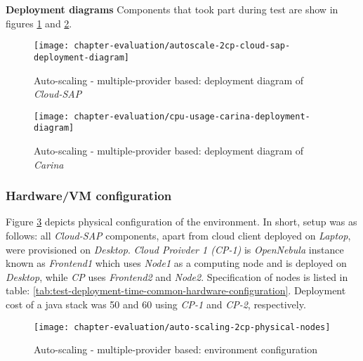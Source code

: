 \begin{asparaenum}
  
  
  \item[\textbf{Deployment diagrams}] Components that took part during test are show in figures \ref{fig:autoscale-2cp-cloud-sap-deployment-diagram} and \ref{fig:auto-scaling-2cp-carina-deployment-diagram}.

  \begin{figure}[!ht]
    \begin{center}
      \texttt{[image: chapter-evaluation/autoscale-2cp-cloud-sap-deployment-diagram]}
    \end{center}
    \caption{Auto-scaling - multiple-provider based: deployment diagram of \emph{Cloud-SAP}}
    \label{fig:autoscale-2cp-cloud-sap-deployment-diagram}
  \end{figure}
  
  \begin{figure}[!ht]
    \begin{center}
      \texttt{[image: chapter-evaluation/cpu-usage-carina-deployment-diagram]}
    \end{center}
    \caption{Auto-scaling - multiple-provider based: deployment diagram of \emph{Carina}}
    \label{fig:auto-scaling-2cp-carina-deployment-diagram}
  \end{figure}
\end{asparaenum}

\subsubsection*{Hardware/VM configuration}

Figure \ref{fig:auto-scaling-2cp-physical-nodes} depicts physical configuration of the environment. In short, setup was as follows: all \emph{Cloud-SAP} components, apart from cloud client deployed on \emph{Laptop}, were provisioned on \emph{Desktop}. \emph{Cloud Proivder 1 (CP-1)} is \emph{OpenNebula} instance known as \emph{Frontend1} which uses \emph{Node1} as a computing node and is deployed on \emph{Desktop}, while \emph{CP} uses \emph{Frontend2} and \emph{Node2}. Specification of nodes is listed in table: \ref{tab:test-deployment-time-common-hardware-configuration}. Deployment cost of a java stack was 50 and 60 using \emph{CP-1} and \emph{CP-2}, respectively.

\begin{figure}[!ht]
  \begin{center}
    \texttt{[image: chapter-evaluation/auto-scaling-2cp-physical-nodes]}
  \end{center}
  \caption{Auto-scaling - multiple-provider based: environment configuration}
  \label{fig:auto-scaling-2cp-physical-nodes}
\end{figure}

